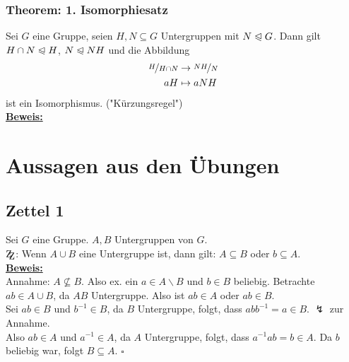 \documentclass[a4paper, pagesize=pdftex, pdftex, twoside, headsepline, index=totoc,toc=listof, fontsize=10pt, cleardoublepage=empty, headinclude, DIV=13, BCOR=13mm]{scrartcl}
\newcommand{\bet}[1]{\uline{\textbf{#1}}} %
\newcommand{\zz}{$\mathrm{Z\kern-.3em\raise-0.5ex\hbox{Z}}$} %
\newcommand{\nt}{\trianglelefteqslant} %
\begin{document}
\subsubsection*{Theorem: 1. Isomorphiesatz}
Sei $G$ eine Gruppe, seien $H,N\subseteq G$ Untergruppen mit $N\nt G$. Dann gilt $H\cap N\nt H$, $N \nt NH$ und die Abbildung
\begin{equation*}
\begin{aligned}
	\nicefrac{H}{H\cap N} &\to \nicefrac{NH}{N}\\
	aH &\mapsto aNH
\end{aligned}
\end{equation*}
ist ein Isomorphismus. \qquad ("Kürzungsregel")\\

\bet{Beweis:}\\

















\cleardoubleoddemptypage
{}
\setcounter{page}{1}
\section*{Aussagen aus den Übungen}
\label{sec:übungenalg}

\subsection*{Zettel 1}
\label{sub:zettel_1alg}
Sei $G$ eine Gruppe. $A,B$ Untergruppen von $G$.\\
\zz: Wenn $A\cup B$ eine Untergruppe ist, dann gilt: $A\subseteq B$ oder $b\subseteq A$.\\

\bet{Beweis:}\\
Annahme: $A\not\subseteq B$. Also ex. ein $a\in A\backslash B$ und $b\in B$ beliebig. Betrachte $ab\in A\cup B$, da $AB$ Untergruppe. Also ist $ab\in A$ oder $ab\in B$.\\
Sei $ab\in B$ und $b^{-1}\in B$, da $B$ Untergruppe, folgt, dass $abb^{-1}=a\in B$. $\lightning$ zur Annahme.\\
Also $ab\in A$ und $a^{-1}\in A$, da $A$ Untergruppe, folgt, dass $a^{-1}ab=b\in A$. Da $b$ beliebig war, folgt $B\subseteq A$.
\hfill $\square$
\end{document}
